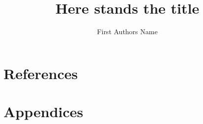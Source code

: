 \documentclass[a4paper, 11pt]{scrreprt}
\title{Here stands the title}
\author[1]{First Authors Name}
\affil[1]{Workplace of first Author}
\begin{document}
\maketitle
\newpage

\tableofcontents














\chapter{References}


\chapter{Appendices}
\end{document}
